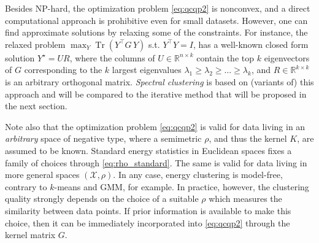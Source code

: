 \documentclass{article}
\DeclareMathOperator{\Tr}{Tr}
\newcommand\kk{K}
\begin{document}
Besides NP-hard, the optimization problem \eqref{eq:qcqp2} is nonconvex, and
a direct computational approach is prohibitive even for small datasets.
However, one can find approximate solutions by relaxing some 
of the constraints.
For instance, the relaxed problem
$\max_{Y} \Tr \left( Y^\top G \, Y \right)$ s.t. $Y^\top Y = I$,
has a well-known closed form solution $Y^\star = U R$, where the
columns of $U \in \mathbb{R}^{n\times k}$ 
contain the top $k$ eigenvectors of $G$ corresponding
to the $k$ largest eigenvalues $\lambda_1\ge \lambda_2\ge\dotsc\ge\lambda_k$, 
and
$R \in \mathbb{R}^{k\times k}$ is an arbitrary orthogonal matrix. 
\emph{Spectral clustering} is based on (variants of) this approach 
and will be compared to the iterative method that will be proposed 
in the next section.

Note also that the optimization problem \eqref{eq:qcqp2} 
is valid for data living in an \emph{arbitrary} space of negative type, where
a semimetric $\rho$, and thus the kernel $\kk$, are
assumed to be known. Standard energy statistics in
Euclidean spaces fixes a family of choices through 
\eqref{eq:rho_standard}.
The same is valid for data living in more general
spaces $(\mathcal{X}, \rho)$.
In any case, energy  clustering 
is model-free, 
contrary to $k$-means and GMM, for example.
In practice, however,
the clustering quality strongly depends on the choice of a suitable
$\rho$ which measures the similarity between data points.
If prior information is available to make this choice, then
it can be immediately incorporated  
into \eqref{eq:qcqp2} through the kernel matrix $G$.
\end{document}
